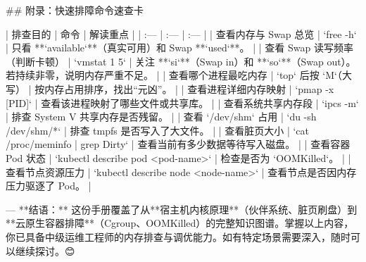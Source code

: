 ## 附录：快速排障命令速查卡

| 排查目的 | 命令 | 解读重点 |
| :--- | :--- | :--- |
| 查看内存与 Swap 总览 | `free -h` | 只看 **`available`**（真实可用）和 Swap **`used`**。 |
| 查看 Swap 读写频率（判断卡顿） | `vmstat 1 5` | 关注 **`si`**（Swap in）和 **`so`**（Swap out）。若持续非零，说明内存严重不足。 |
| 查看哪个进程最吃内存 | `top` 后按 `M`（大写） | 按内存占用排序，找出“元凶”。 |
| 查看进程详细内存映射 | `pmap -x [PID]` | 查看该进程映射了哪些文件或共享库。 |
| 查看系统共享内存段 | `ipcs -m` | 排查 System V 共享内存是否残留。 |
| 查看 `/dev/shm` 占用 | `du -sh /dev/shm/*` | 排查 tmpfs 是否写入了大文件。 |
| 查看脏页大小 | `cat /proc/meminfo | grep Dirty` | 查看当前有多少数据等待写入磁盘。 |
| 查看容器 Pod 状态 | `kubectl describe pod <pod-name>` | 检查是否为 `OOMKilled`。 |
| 查看节点资源压力 | `kubectl describe node <node-name>` | 查看节点是否因内存压力驱逐了 Pod。 |

---
**结语：** 这份手册覆盖了从**宿主机内核原理**（伙伴系统、脏页刷盘）到**云原生容器排障**（Cgroup、OOMKilled）的完整知识图谱。掌握以上内容，你已具备中级运维工程师的内存排查与调优能力。如有特定场景需要深入，随时可以继续探讨。😊